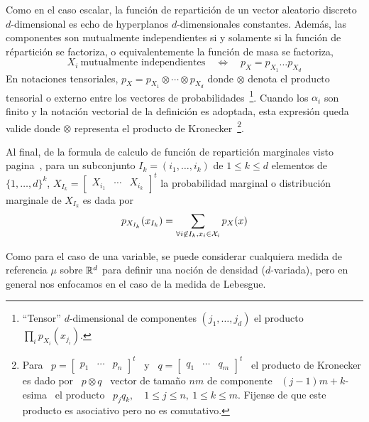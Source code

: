 Como en  el caso escalar, la  funci\'on de repartici\'on de  un vector aleatorio
discreto $d$-dimensional es echo de hyperplanos $d$-dimensionales constantes.
Adem\'as, las  componentes son mutualmente  independientes si y solamente  si la
funci\'on de  r\'epartici\'on se factoriza,  o equivalentemente la  funci\'on de
masa se factoriza, \ie
%
\[
X_i  \:  \mbox{mutualmente independientes}  \quad  \Leftrightarrow  \quad p_X  =
p_{X_1} \ldots  p_{X_d}
\]
%
En notaciones tensoriales, $p_X =  p_{X_1} \otimes \cdots \otimes p_{X_d}$ donde
$\otimes$  denota  el  producto  tensorial  o  externo  entre  los  vectores  de
probabilidades~\footnote{``Tensor''      $d$-dimensional      de     componentes
  $(j_1,\ldots,j_d)$  el  producto $\prod_i  p_{X_i}  (x_{j_i})$.}.  Cuando  los
$\alpha_i$ son finito y la  notaci\'on vectorial de la definici\'on es adoptada,
esta  expresi\'on  queda  valide  donde  $\otimes$  representa  el  producto  de
Kronecker~\footnote{Para   \    $p   =   \begin{bmatrix}   p_1    &   \cdots   &
    p_n  \end{bmatrix}^t$   \  y  \  $q   =  \begin{bmatrix}  q_1   &  \cdots  &
    q_m \end{bmatrix}^t$ \ el producto de  Kronecker es dado por \ $p \otimes q$
  \ vector de tama\~no $n m$ de componente \ $(j-1) m + k$-esima \ el producto \
  $p_j  q_k, \quad 1  \le j  \le n,  \: 1  \le k  \le m$.   Fijense de  que este
  producto es asociativo pero no es comutativo.\label{foot:MP:Kronecker}}.

Al  final, de la  formula de  calculo de  funci\'on de  repartici\'on marginales
visto  pagina~\pageref{pagina:MP:MarginalesF},   para  un  subconjunto   $I_k  =
(i_1,\ldots,i_k)$ de  $1 \le k  \le d$ elementos  de $\{ 1  , \ldots ,  d \}^k$,
$X_{I_k}  =  \begin{bmatrix}  X_{i_1}  &  \cdots  &  X_{i_k}\end{bmatrix}^t$  la
probabilidad marginal o distribuci\'on marginale de $X_{I_k}$ es dada por
%
\[
p_{X_{I_k}}(x_{I_k}) = \sum_{\forall i \not\in I_k, x_i \in \mathcal{X}_i} p_X(x)
\]




\label{sec:MP:VecContinuo}

Como para  el caso  de una  variable, se puede  considerar cualquiera  medida de
referencia  $\mu$  sobre  $\mathbb{R}^d$   para  definir  una  noci\'on  de  densidad
($d$-variada),  pero  en general  nos  enfocamos  en el  caso  de  la medida  de
Lebesgue.

